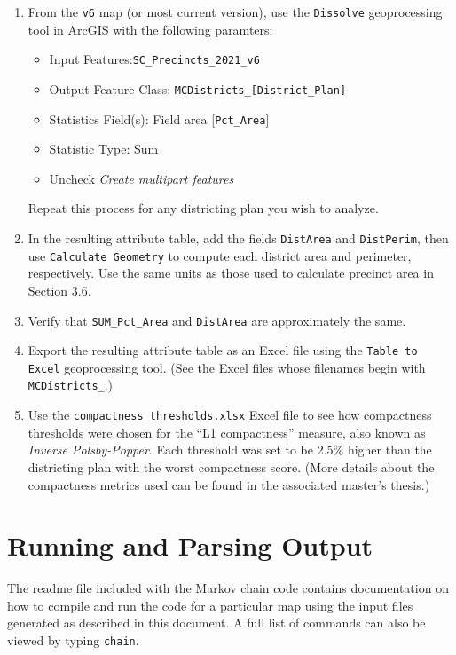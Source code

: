 \documentclass[11pt]{article}
\begin{document}
\begin{enumerate}
\item From the \verb|v6| map (or most current version), use the \verb|Dissolve| geoprocessing tool in ArcGIS with the following paramters:
\begin{itemize}
	\item Input Features:\verb|SC_Precincts_2021_v6|
	\item Output Feature Class: \verb|MCDistricts_[District_Plan]|
	\item Statistics Field(s): Field area [\verb|Pct_Area|]
	\item Statistic Type: Sum
	\item Uncheck \textit{Create multipart features}
\end{itemize}

Repeat this process for any districting plan you wish to analyze.

\item In the resulting attribute table, add the fields \verb|DistArea| and \verb|DistPerim|, then use \verb|Calculate Geometry| to compute each district area and perimeter, respectively. Use the same units as those used to calculate precinct area in Section 3.6.
\item Verify that \verb|SUM_Pct_Area| and \verb|DistArea| are approximately the same.
\item Export the resulting attribute table as an Excel file using the \verb|Table to Excel| geoprocessing tool. (See the Excel files whose filenames begin with \verb|MCDistricts_|.)
\item Use the \verb|compactness_thresholds.xlsx| Excel file to see how compactness thresholds were chosen for the ``L1 compactness'' measure, also known as \textit{Inverse Polsby-Popper}. Each threshold was set to be 2.5\% higher than the districting plan with the worst compactness score. (More details about the compactness metrics used can be found in the associated master's thesis.)
\end{enumerate}

\section{Running and Parsing Output}

The readme file included with the Markov chain code contains documentation on how to compile and run the code for a particular map using the input files generated as described in this document. A full list of commands can also be viewed by typing \verb|chain|.\\
\end{document}
